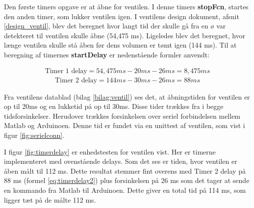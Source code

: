 Den første timers opgave er at åbne for ventilen. I denne timers \textbf{stopFcn}, startes den anden timer, som lukker ventilen igen. I ventilens design dokument, afsnit \ref{design_ventil}, blev det beregnet hvor langt tid der skulle gå fra en ø var detekteret til ventilen skulle åbne (54,475 ms). Ligeledes blev det beregnet, hvor længe ventilen skulle stå åben før dens volumen er tømt igen (144 ms). Til at beregning af timernes \textbf{startDelay} er nedenstående formler anvendt: 

\begin{align}
\text{Timer 1 delay}=54,475ms-20ms-26ms=8,475ms
\label{eq:timerdelay1}
\end{align} 
\begin{align}
\text{Timer 2 delay}=144ms-30ms-26ms= 88ms
\label{eq:timerdelay2}
\end{align} 

Fra ventilens datablad (bilag \ref{bilag:ventil}) ses det, at åbningstiden for ventilen er op til 20ms og en lukketid på op til 30ms. Disse tider trækkes fra i begge tidsforsinkelser. Herudover trækkes forsinkelsen over seriel forbindelsen mellem Matlab og Arduinoen. Denne tid er fundet via en unittest af ventilen, som vist i figur \ref{fig:serielconn}.   

I figur \ref{fig:timerdelay} er enhedstesten for ventilen vist. Her er timerne implementeret med ovenstående delays. Som det ses er tiden, hvor ventilen er åben målt til 112 ms. Dette resultat stemmer fint overens med Timer 2 delay på 88 ms (formel \ref{eq:timerdelay2}) plus forsinkelsen på 26 ms som det tager at sende en kommando fra Matlab til Arduinoen. Dette giver en total tid på 114 ms, som ligger tæt på de målte 112 ms. 

